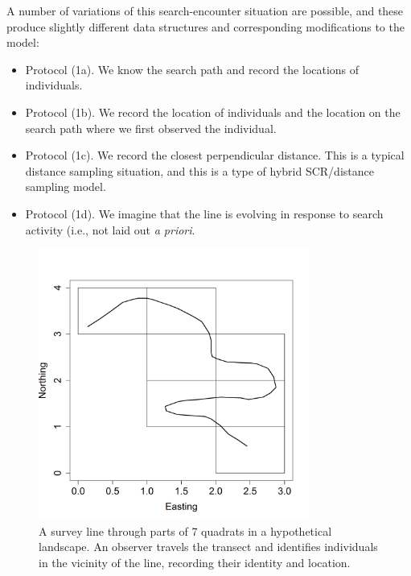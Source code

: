  A number of variations of this search-encounter situation are possible,
and these produce slightly different data structures and corresponding
modifications to the model:
\begin{itemize}
 \item[] Protocol (1a). We know the search path and record the
   locations of individuals. 
 \item[] Protocol (1b). We record the location of individuals and
   the location on the search path where we first observed the individual.
 \item[] Protocol (1c). We record
the closest perpendicular distance. This is a typical
   distance sampling situation, and this is a type of hybrid
   SCR/distance sampling model. 
 \item[] Protocol (1d).  We imagine that the line is evolving in response
   to search activity (i.e., not laid out {\it a priori}. 
 \end{itemize}


\begin{figure}
\centering
\includegraphics[width=3.5in,height=3.5in]{Ch15-searchencounter/figs/snakeline.png}
\caption{
A survey line through parts of 7 quadrats in a
  hypothetical landscape. An observer travels the transect and
  identifies individuals in the vicinity of the line, recording their
  identity and location.
}
\label{searchencounter.fig.snakeline}
\end{figure}


